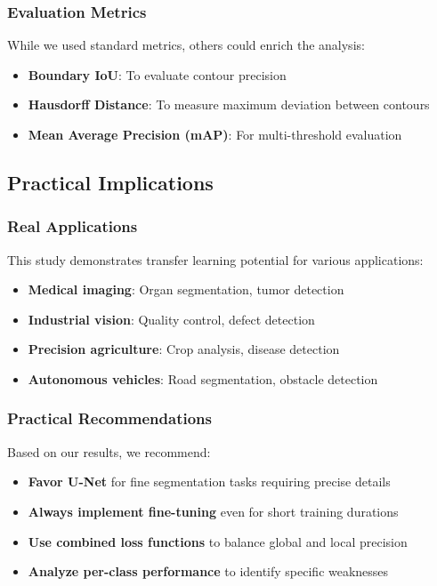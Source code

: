 \documentclass[12pt,a4paper]{article}
\begin{document}
\subsubsection{Evaluation Metrics}

While we used standard metrics, others could enrich the analysis:
\begin{itemize}
    \item \textbf{Boundary IoU}: To evaluate contour precision
    \item \textbf{Hausdorff Distance}: To measure maximum deviation between contours
    \item \textbf{Mean Average Precision (mAP)}: For multi-threshold evaluation
\end{itemize}

\subsection{Practical Implications}

\subsubsection{Real Applications}

This study demonstrates transfer learning potential for various applications:
\begin{itemize}
    \item \textbf{Medical imaging}: Organ segmentation, tumor detection
    \item \textbf{Industrial vision}: Quality control, defect detection
    \item \textbf{Precision agriculture}: Crop analysis, disease detection
    \item \textbf{Autonomous vehicles}: Road segmentation, obstacle detection
\end{itemize}

\subsubsection{Practical Recommendations}

Based on our results, we recommend:
\begin{itemize}
    \item \textbf{Favor U-Net} for fine segmentation tasks requiring precise details
    \item \textbf{Always implement fine-tuning} even for short training durations
    \item \textbf{Use combined loss functions} to balance global and local precision
    \item \textbf{Analyze per-class performance} to identify specific weaknesses
\end{itemize}
\end{document}
